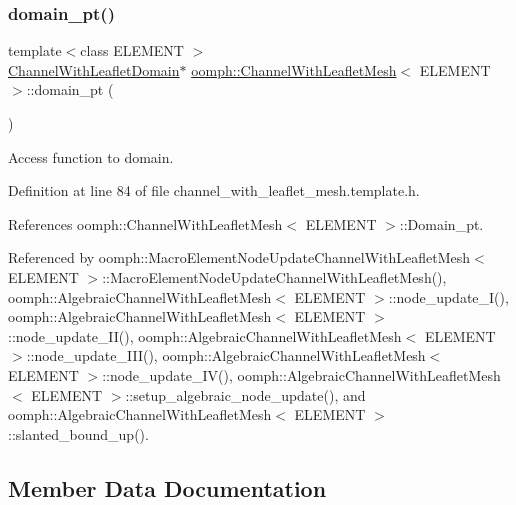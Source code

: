 \subsubsection{\texorpdfstring{domain\+\_\+pt()}{domain\_pt()}}
{\footnotesize\ttfamily template$<$class E\+L\+E\+M\+E\+NT $>$ \\
\hyperlink{classoomph_1_1ChannelWithLeafletDomain}{Channel\+With\+Leaflet\+Domain}$\ast$ \hyperlink{classoomph_1_1ChannelWithLeafletMesh}{oomph\+::\+Channel\+With\+Leaflet\+Mesh}$<$ E\+L\+E\+M\+E\+NT $>$\+::domain\+\_\+pt (\begin{DoxyParamCaption}{ }\end{DoxyParamCaption})\hspace{0.3cm}{\ttfamily [inline]}}



Access function to domain. 



Definition at line 84 of file channel\+\_\+with\+\_\+leaflet\+\_\+mesh.\+template.\+h.



References oomph\+::\+Channel\+With\+Leaflet\+Mesh$<$ E\+L\+E\+M\+E\+N\+T $>$\+::\+Domain\+\_\+pt.



Referenced by oomph\+::\+Macro\+Element\+Node\+Update\+Channel\+With\+Leaflet\+Mesh$<$ E\+L\+E\+M\+E\+N\+T $>$\+::\+Macro\+Element\+Node\+Update\+Channel\+With\+Leaflet\+Mesh(), oomph\+::\+Algebraic\+Channel\+With\+Leaflet\+Mesh$<$ E\+L\+E\+M\+E\+N\+T $>$\+::node\+\_\+update\+\_\+\+I(), oomph\+::\+Algebraic\+Channel\+With\+Leaflet\+Mesh$<$ E\+L\+E\+M\+E\+N\+T $>$\+::node\+\_\+update\+\_\+\+I\+I(), oomph\+::\+Algebraic\+Channel\+With\+Leaflet\+Mesh$<$ E\+L\+E\+M\+E\+N\+T $>$\+::node\+\_\+update\+\_\+\+I\+I\+I(), oomph\+::\+Algebraic\+Channel\+With\+Leaflet\+Mesh$<$ E\+L\+E\+M\+E\+N\+T $>$\+::node\+\_\+update\+\_\+\+I\+V(), oomph\+::\+Algebraic\+Channel\+With\+Leaflet\+Mesh$<$ E\+L\+E\+M\+E\+N\+T $>$\+::setup\+\_\+algebraic\+\_\+node\+\_\+update(), and oomph\+::\+Algebraic\+Channel\+With\+Leaflet\+Mesh$<$ E\+L\+E\+M\+E\+N\+T $>$\+::slanted\+\_\+bound\+\_\+up().



\subsection{Member Data Documentation}
\mbox{\label{classoomph_1_1ChannelWithLeafletMesh_a20dc25dbf38222156f72b6d6213c5246}} 
